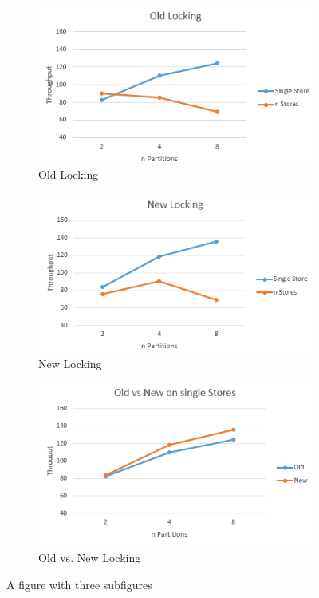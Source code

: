 \begin{figure}
    \centering
    \begin{subfigure}{.5\textwidth}
      \centering
      \includegraphics[width=.7\linewidth]{Figures/old_locking.PNG}
      \caption{Old Locking}
      \label{fig:oldlock}
    \end{subfigure}%
    \begin{subfigure}{.5\textwidth}
      \centering
      \includegraphics[width=.7\linewidth]{Figures/new_locking.PNG}
      \caption{New Locking}
      \label{fig:newlock}
    \end{subfigure}
    \begin{subfigure}{.7\textwidth}
        \centering
        \includegraphics[width=.7\linewidth]{Figures/old_vs_new.PNG}
        \caption{Old vs. New Locking}
        \label{fig:oldandnewlock}
      \end{subfigure}
    \caption{A figure with three subfigures}
    \label{fig:lock_comp}
\end{figure}

